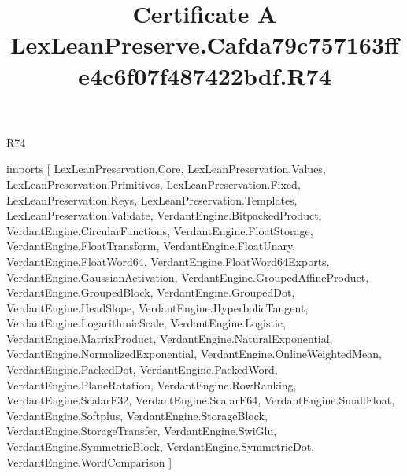 \begin{lexlean}{R74}
\title{Certificate A LexLeanPreserve.Cafda79c757163ffe4c6f07f487422bdf.R74}
\begin{coremodule}
imports [
  LexLeanPreservation.Core,
  LexLeanPreservation.Values,
  LexLeanPreservation.Primitives,
  LexLeanPreservation.Fixed,
  LexLeanPreservation.Keys,
  LexLeanPreservation.Templates,
  LexLeanPreservation.Validate,
  VerdantEngine.BitpackedProduct,
  VerdantEngine.CircularFunctions,
  VerdantEngine.FloatStorage,
  VerdantEngine.FloatTransform,
  VerdantEngine.FloatUnary,
  VerdantEngine.FloatWord64,
  VerdantEngine.FloatWord64Exports,
  VerdantEngine.GaussianActivation,
  VerdantEngine.GroupedAffineProduct,
  VerdantEngine.GroupedBlock,
  VerdantEngine.GroupedDot,
  VerdantEngine.HeadSlope,
  VerdantEngine.HyperbolicTangent,
  VerdantEngine.LogarithmicScale,
  VerdantEngine.Logistic,
  VerdantEngine.MatrixProduct,
  VerdantEngine.NaturalExponential,
  VerdantEngine.NormalizedExponential,
  VerdantEngine.OnlineWeightedMean,
  VerdantEngine.PackedDot,
  VerdantEngine.PackedWord,
  VerdantEngine.PlaneRotation,
  VerdantEngine.RowRanking,
  VerdantEngine.ScalarF32,
  VerdantEngine.ScalarF64,
  VerdantEngine.SmallFloat,
  VerdantEngine.Softplus,
  VerdantEngine.StorageBlock,
  VerdantEngine.StorageTransfer,
  VerdantEngine.SwiGlu,
  VerdantEngine.SymmetricBlock,
  VerdantEngine.SymmetricDot,
  VerdantEngine.WordComparison
]


\end{coremodule}
\end{lexlean}
